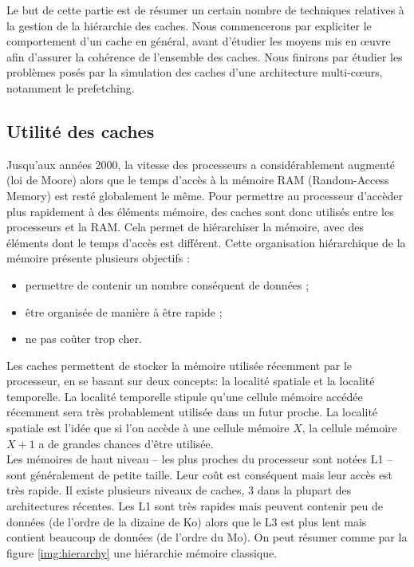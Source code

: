 Le but de cette partie est de résumer un certain nombre de techniques relatives à la gestion de la hiérarchie des caches. Nous commencerons par expliciter le comportement d'un cache en général, avant d'étudier les moyens mis en {\oe}uvre afin d'assurer la cohérence de l'ensemble des caches. Nous finirons par étudier les problèmes posés par la simulation des caches d'une architecture multi-c{\oe}urs, notamment le prefetching.

\subsection{Utilité des caches}

Jusqu'aux années 2000, la vitesse des processeurs a considérablement augmenté (loi de Moore) alors que le temps d'accès à la mémoire RAM (Random-Access Memory) est resté globalement le même. Pour permettre au processeur d'accèder plus rapidement à des éléments mémoire, des caches sont donc utilisés entre les processeurs et la RAM. Cela permet de hiérarchiser la mémoire, avec des éléments dont le temps d'accès est différent. Cette organisation hiérarchique de la mémoire présente plusieurs objectifs : \\
\begin{itemize}
\item permettre de contenir un nombre conséquent de données ;
\item être organisée de manière à être rapide ;
\item ne pas coûter trop cher.\\ 
\end{itemize}

Les caches permettent de stocker la mémoire utilisée récemment par le processeur, en se basant sur deux concepts: la localité spatiale et la localité temporelle. La localité temporelle stipule qu'une cellule mémoire accédée récemment sera très probablement utilisée dans un futur proche. La localité spatiale est l'idée que si l'on accède à une cellule mémoire $X$, la cellule mémoire $X+1$ a de grandes chances d'être utilisée. \\

Les mémoires de haut niveau -- les plus proches du processeur sont notées L1 -- sont généralement de petite taille. Leur coût est conséquent mais leur accès est très rapide. Il existe plusieurs niveaux de caches, $3$ dans la plupart des architectures récentes. Les L1 sont très rapides mais peuvent contenir peu de données (de l'ordre de la dizaine de Ko) alors que le L3 est plus lent mais contient beaucoup de données (de l'ordre du Mo). On peut résumer comme par la figure \ref{img:hierarchy} une hiérarchie mémoire classique.\\

